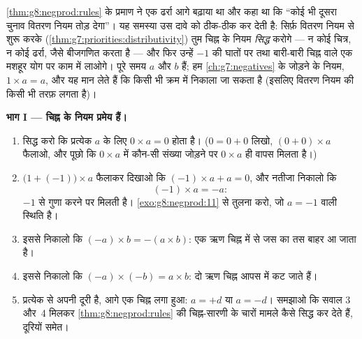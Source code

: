 \begin{problem}
\label{pb:g8:negprod:1}
\cref{thm:g8:negprod:rules} के प्रमाण ने एक ढर्रा आगे बढ़ाया था और
कहा था कि ``कोई भी दूसरा चुनाव वितरण नियम तोड़ देगा''। यह समस्या उस
दावे को ठीक-ठीक कर देती है: सिर्फ़ वितरण नियम से शुरू करके
(\cref{thm:g7:priorities:distributivity}) तुम चिह्न के नियम
\emph{सिद्ध} करोगे --- न कोई चित्र, न कोई ढर्रा, जैसे बीजगणित करता
है --- और फिर उन्हें $-1$ की घातों पर तथा बारी-बारी चिह्न वाले एक
मशहूर योग पर काम में लाओगे। पूरे समय $a$ और $b$ 
हैं; हम \cref{ch:g7:negatives} के जोड़ने के नियम, $1 \times a = a$,
और यह मान लेते हैं कि  किसी भी क्रम में निकाला जा सकता है
(इसलिए वितरण नियम  की किसी भी तरफ़ लगता है)।

\medskip
\noindent\textbf{भाग I --- चिह्न के नियम प्रमेय हैं।}
\begin{enumerate}
  \item सिद्ध करो कि प्रत्येक  $a$ के लिए
        $0 \times a = 0$ होता है। ($0 = 0 + 0$ लिखो,
        $(0 + 0) \times a$ फैलाओ, और पूछो कि $0 \times a$ में
        कौन-सी संख्या जोड़ने पर $0 \times a$ ही वापस मिलता है।)
  \item $\bigl(1 + (-1)\bigr) \times a$ फैलाकर दिखाओ कि
        $(-1) \times a + a = 0$, और नतीजा निकालो कि
        \[
        (-1) \times a = -a :
        \]
        $-1$ से गुणा करने पर  मिलती है।
        \cref{exo:g8:negprod:11} से तुलना करो, जो $a = -1$ वाली
        स्थिति है।
  \item इससे निकालो कि $(-a) \times b = -(a \times b)$: एक ऋण चिह्न
         में से जस का तस बाहर आ जाता है।
  \item इससे निकालो कि $(-a) \times (-b) = a \times b$: दो ऋण चिह्न
        आपस में कट जाते हैं।
  \item प्रत्येक   से अपनी दूरी है, आगे एक चिह्न
        लगा हुआ: $a = +d$ या $a = -d$। समझाओ कि सवाल 3 और~4 मिलकर
        \cref{thm:g8:negprod:rules} की चिह्न-सारणी के चारों मामले
        कैसे सिद्ध कर देते हैं, दूरियों समेत।
\end{enumerate}


\end{problem}
